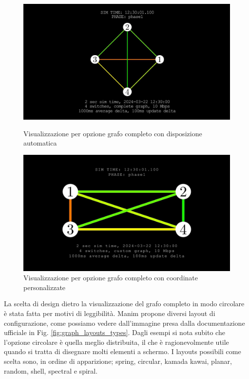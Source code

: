 \documentclass[binding=0.6cm]{sapthesis}
\begin{document}
\begin{figure}[h]
    \centering
    \begin{minipage}{0.46\textwidth}
      \includegraphics[width=\linewidth]{immagini/custom_complete_autopositioning.JPG}
      \caption{Visualizzazione per opzione grafo completo con disposizione automatica}
      \label{fig:custom_complete_autopositioning}
    \end{minipage}\hfill
    \begin{minipage}{0.47\textwidth}
      \includegraphics[width=\linewidth]{immagini/custom_complete_manual_positioning.JPG}
      \caption{Visualizzazione per opzione grafo completo con coordinate personalizzate}
      \label{fig:custom_complete_manual_positioning}
    \end{minipage}
\end{figure}


La scelta di design dietro la visualizzazione del grafo completo in modo circolare è stata fatta per motivi di leggibilità. Manim propone diversi
layout di configurazione, come possiamo vedere dall'immagine presa dalla documentazione ufficiale \cite{manimGraph} in Fig. \ref{fig:graph_layouts_types}. Dagli esempi
si nota subito che l'opzione circolare è quella meglio distribuita, il che è ragionevolmente utile quando si tratta di disegnare molti elementi a schermo. 
I layouts possibili come scelta sono, in ordine di apparizione; spring, circular, kamada kawai, planar, random, shell, spectral e spiral.
\end{document}
